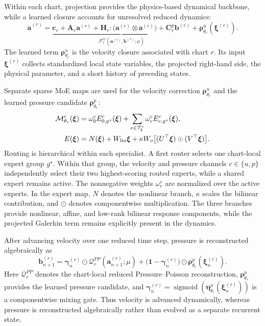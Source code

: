 Within each chart, projection provides the physics-based dynamical backbone, while a learned closure accounts for unresolved reduced dynamics:
\begin{equation}
  \dot{\bm a}^{(r)}=
  \underbrace{\bm c_r+\bm A_r\bm a^{(r)}+
  \bm H_r:\bigl(\bm a^{(r)}\otimes\bm a^{(r)}\bigr)+
  \bm C^p_r\bm b^{(r)}}_{\mathcal F_r^{G}(\bm a^{(r)},\bm b^{(r)};\mu)}
  +\bm\rho^u_{\theta_r}(\bm\xi^{(r)}).
  \label{eq:main_specialist}
\end{equation}
The learned term $\bm\rho^u_{\theta_r}$ is the velocity closure associated with chart $r$. Its input $\bm\xi^{(r)}$ collects standardized local state variables, the projected right-hand side, the physical parameter, and a short history of preceding states.

Separate sparse MoE maps are used for the velocity correction $\bm\rho^u_{\theta_r}$ and the learned pressure candidate $\bm\rho^p_{\theta_r}$:
\begin{equation}
  \begin{aligned}
  \mathcal M^c_{\theta_r}(\bm\xi)&=
  \omega^c_0 E^c_{0,g^\star}(\bm\xi)+
  \sum_{e\in\mathcal T_2^c}\omega^c_e E^c_{e,g^\star}(\bm\xi),\\
  E(\bm\xi)&=N(\bm\xi)+W_{\rm lin}\bm\xi+
  \kappa W_o\bigl[(U^\top\bm\xi)\odot(V^\top\bm\xi)\bigr].
  \end{aligned}
  \label{eq:main_inner_moe}
\end{equation}
Routing is hierarchical within each specialist. A first router selects one chart-local expert group $g^\star$. Within that group, the velocity and pressure channels $c\in\{u,p\}$ independently select their two highest-scoring routed experts, while a shared expert remains active. The nonnegative weights $\omega_e^c$ are normalized over the active experts. In the expert map, $N$ denotes the nonlinear branch, $\kappa$ scales the bilinear contribution, and $\odot$ denotes componentwise multiplication. The three branches provide nonlinear, affine, and low-rank bilinear response components, while the projected Galerkin term remains explicitly present in the dynamics.

After advancing velocity over one reduced time step, pressure is reconstructed algebraically as
\begin{equation}
  \bm b_{n+1}^{(r)}
  =\bm\gamma_n^{(r)}\odot\mathcal Q_r^{PP}(\bm a_{n+1}^{(r)};\mu)
  +\bigl(\bm 1-\bm\gamma_n^{(r)}\bigr)
   \odot\bm\rho^p_{\theta_r}(\bm\xi_n^{(r)}).
  \label{eq:main_pressure_closure}
\end{equation}
Here $\mathcal Q_r^{PP}$ denotes the chart-local reduced Pressure--Poisson reconstruction, $\bm\rho^p_{\theta_r}$ provides the
learned pressure candidate, and $\bm\gamma_n^{(r)} =\operatorname{sigmoid}(\bm\eta^p_{\theta_r}(\bm\xi_n^{(r)}))$ is a componentwise mixing gate. Thus velocity is advanced dynamically, whereas pressure is reconstructed algebraically rather than evolved as a separate recurrent state.


